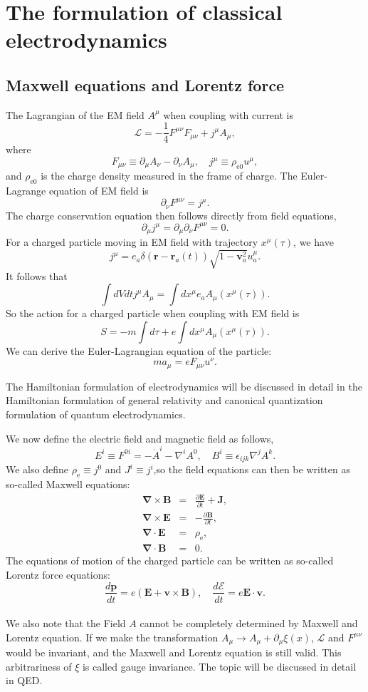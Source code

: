 \section{The formulation of classical electrodynamics}
\subsection{Maxwell equations and Lorentz force}
The Lagrangian of the EM field $A^{\mu}$ when coupling with current is
\[\mathcal{L} = -\frac{1}{4}F^{\mu\nu}F_{\mu\nu} + j^{\mu} A_{\mu},\]
where
\[F_{\mu\nu} \equiv \partial_{\mu}A_{\nu} - \partial_{\nu}A_{\mu} , \quad j^{\mu} \equiv \rho_{\mathrm{e}0} u^{\mu},\]
and $\rho_{\mathrm{e}0}$ is the charge density measured in the frame of charge.
The Euler-Lagrange equation of EM field is
\[\partial_{\nu} F^{\mu\nu} = j^{\mu}.\]
The charge conservation equation then follows directly from field equations,
\[\partial_{\mu} j^{\mu} = \partial_{\mu} \partial_{\nu} F^{\mu\nu} = 0.\]
For a charged particle moving in EM field with trajectory $x^{\mu}(\tau)$, we have
\[j^{\mu} =  e_a \delta(\bm{r}-\bm{r}_a(t)) \sqrt{1-\bm{v}_a^2} u_a^\mu .\]
It follows that
\[\int dV dt j^{\mu} A_{\mu} = \int dx^{\mu} e_a A_{\mu}(x^{\mu}(\tau)).\]
So the action for a charged particle when coupling with EM field is
\[S = - m \int d\tau + e\int dx^{\mu} A_{\mu}(x^{\mu}(\tau)).\]
We can derive the Euler-Lagrangian equation of the particle:
\[ma_{\mu} = eF_{\mu \nu}u^{\nu}.\]
\begin{note}
The Hamiltonian formulation of electrodynamics will be discussed in detail in the Hamiltonian formulation of general relativity and canonical quantization formulation of quantum electrodynamics.
\end{note}
\noindent
We now define the electric field and magnetic field as follows,
\[E^i \equiv F^{0i} = -\dot{A}^i - \nabla^i A^0 , \quad B^i \equiv \epsilon_{ijk} \nabla^j A^k.\]
We also define $\rho_{\mathrm{e}} \equiv j^0$ and $J^i \equiv j^i$,so
the field equations can then be written as so-called Maxwell equations:
\begin{eqnarray}
	\bm{\nabla} \times  \bm{B} &=& \frac{\partial \bm{E}}{\partial t} +  \bm{J} ,\nonumber \\
	\bm{\nabla} \times \bm{E} &=& -\frac{\partial \bm{B}}{\partial t} ,\nonumber \\
	\bm{\nabla} \cdot \bm{E} &=& \rho_{\mathrm{e}}, \nonumber \\
	\bm{\nabla} \cdot \bm{B} &=& 0 .\nonumber
\end{eqnarray}
The equations of motion of the charged particle can be written as so-called Lorentz force equations:
\[\frac{d\bm{p}}{dt} = e(\bm{E} + \bm{v} \times \bm{B}) , \quad \frac{d \mathcal{E}}{dt} = e \bm{E} \cdot \bm{v}.\]
\\
We also note that the Field $A$ cannot be completely determined by Maxwell and Lorentz equation. If we make the transformation $A_{\mu} \to A_{\mu} + \partial_{\mu} \xi(x)$, $\mathcal{L}$ and $F^{\mu\nu}$ would be invariant, and the Maxwell and Lorentz equation is still valid. This arbitrariness of $\xi$ is called gauge invariance. The topic will be discussed in detail in QED.

